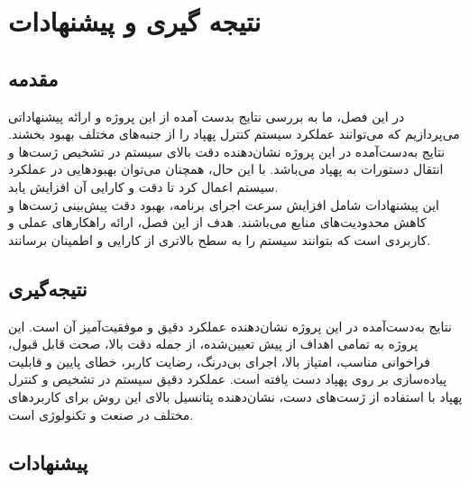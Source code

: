 \chapter{نتیجه گیری و پیشنهادات}
\section{مقدمه}
در این فصل، ما به بررسی نتایج بدست آمده از این پروژه و ارائه پیشنهاداتی می‌پردازیم که می‌توانند عملکرد سیستم کنترل پهپاد را از جنبه‌های مختلف بهبود بخشند. نتایج به‌دست‌آمده در این پروژه نشان‌دهنده دقت بالای سیستم در تشخیص ژست‌ها و انتقال دستورات به پهپاد می‌باشد. با این حال، همچنان می‌توان بهبودهایی در عملکرد سیستم اعمال کرد تا دقت و کارایی آن افزایش یابد.
\\
این پیشنهادات شامل افزایش سرعت اجرای برنامه، بهبود دقت پیش‌بینی ژست‌ها و کاهش محدودیت‌های منابع می‌باشند. هدف از این فصل، ارائه راهکارهای عملی و کاربردی است که بتوانند سیستم را به سطح بالاتری از کارایی و اطمینان برسانند.


\section{نتیجه‌گیری}
نتایج به‌دست‌آمده در این پروژه نشان‌دهنده عملکرد دقیق و موفقیت‌آمیز آن است. این پروژه به تمامی اهداف از پیش تعیین‌شده، از جمله دقت بالا، صحت قابل قبول، فراخوانی مناسب، امتیاز  بالا، اجرای بی‌درنگ، رضایت کاربر، خطای پایین و قابلیت پیاده‌سازی بر روی پهپاد دست یافته است. عملکرد دقیق سیستم در تشخیص و کنترل پهپاد با استفاده از ژست‌های دست، نشان‌دهنده پتانسیل بالای این روش برای کاربردهای مختلف در صنعت و تکنولوژی است.


\section{پیشنهادات}
